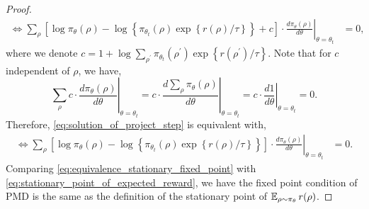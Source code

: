 \begin{proof}
\begin{equation}
\begin{split}
		\iff \left. \sum\limits_{\rho}{ \left[ \log{\pi_\theta(\rho)} - \log\left\{\pi_{\theta_t}(\rho) \exp\left\{r(\rho) / \tau\right\} \right\} + c \right] \cdot \frac{d \pi_{\theta}(\rho)}{d \theta} } \right\vert_{\theta = \theta_t} &= 0,
	\end{split}
	\end{equation}
	where we denote $c = 1 + \log{ \sum\limits_{\rho^\prime}{\pi_{\theta_t}(\rho^\prime) \exp\left\{r(\rho^\prime) / \tau\right\} } }$. Note that for $c$ independent of $\rho$, we have,
	\begin{equation*}
		\left. \sum\limits_{\rho}{ c \cdot \frac{d \pi_{\theta}(\rho)}{d \theta} } \right\vert_{\theta = \theta_t} = c \cdot \left. \frac{d \sum_{\rho}{ \pi_{\theta}(\rho) }}{d \theta} \right\vert_{\theta = \theta_t} = c \cdot \left. \frac{d 1}{d \theta} \right\vert_{\theta = \theta_t} = 0.
	\end{equation*}
	Therefore, \cref{eq:solution_of_project_step} is equivalent with,
	\begin{equation}
	\label{eq:equivalence_stationary_fixed_point}
	\begin{split}
		\iff \left. \sum\limits_{\rho}{ \left[ \log{\pi_\theta(\rho)} - \log\left\{\pi_{\theta_t}(\rho) \exp\left\{r(\rho) / \tau\right\} \right\} \right] \cdot \frac{d \pi_{\theta}(\rho)}{d \theta} } \right\vert_{\theta = \theta_t} &= 0.
	\end{split}
	\end{equation}
	Comparing \cref{eq:equivalence_stationary_fixed_point} with \cref{eq:stationary_point_of_expected_reward}, we have the fixed point condition of PMD is the same as the definition of the stationary point of $\operatorname{\mathbb{E}}_{\rho \sim \pi_\theta}{  r(\rho)}$.
\end{proof}

